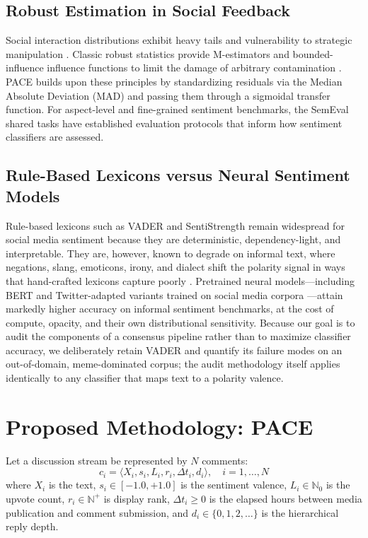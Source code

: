 \documentclass[journal]{IEEEtran}
\begin{document}
\subsection{Robust Estimation in Social Feedback}
Social interaction distributions exhibit heavy tails and vulnerability to strategic manipulation \cite{muchnik2013social, borghol2012untold}. Classic robust statistics provide M-estimators and bounded-influence influence functions to limit the damage of arbitrary contamination \cite{huber1981robust, hampel1986robust, rousseeuw1993alternatives}. PACE builds upon these principles by standardizing residuals via the Median Absolute Deviation (MAD) and passing them through a sigmoidal transfer function. For aspect-level and fine-grained sentiment benchmarks, the SemEval shared tasks \cite{pontiki2016semeval} have established evaluation protocols that inform how sentiment classifiers are assessed.

\subsection{Rule-Based Lexicons versus Neural Sentiment Models}
Rule-based lexicons such as VADER \cite{hutto2014vader} and SentiStrength \cite{thelwall2010sentiment} remain widespread for social media sentiment because they are deterministic, dependency-light, and interpretable. They are, however, known to degrade on informal text, where negations, slang, emoticons, irony, and dialect shift the polarity signal in ways that hand-crafted lexicons capture poorly \cite{thelwall2018social}. Pretrained neural models---including BERT \cite{devlin2019bert} and Twitter-adapted variants trained on social media corpora \cite{barbieri2020tweeteval}---attain markedly higher accuracy on informal sentiment benchmarks, at the cost of compute, opacity, and their own distributional sensitivity. Because our goal is to audit the components of a consensus pipeline rather than to maximize classifier accuracy, we deliberately retain VADER and quantify its failure modes on an out-of-domain, meme-dominated corpus; the audit methodology itself applies identically to any classifier that maps text to a polarity valence.

\section{Proposed Methodology: PACE}

Let a discussion stream be represented by $N$ comments:
\begin{equation}
c_i = \langle X_i, s_i, L_i, r_i, \Delta t_i, d_i \rangle, \quad i = 1, \dots, N
\end{equation}
where $X_i$ is the text, $s_i \in [-1.0, +1.0]$ is the sentiment valence, $L_i \in \mathbb{N}_0$ is the upvote count, $r_i \in \mathbb{N}^+$ is display rank, $\Delta t_i \ge 0$ is the elapsed hours between media publication and comment submission, and $d_i \in \{0, 1, 2, \dots\}$ is the hierarchical reply depth.
\end{document}
